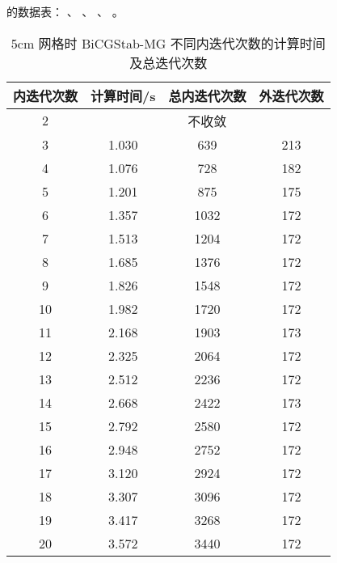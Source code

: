 \begin{datasheet}
的数据表：
、
、
、
。

\begin{table}
\centering
\caption{5cm 网格时 BiCGStab-MG 不同内迭代次数的计算时间及总迭代次数}
\label{tab:equsolve.iter.bicgstab-mg.5cm}
\begin{tabular}{cccc}
\toprule
内迭代次数 & 计算时间/s & 总内迭代次数 & 外迭代次数\\
\midrule
2 & \multicolumn{3}{c}{不收敛} \\  %
3 & 1.030 & 639 & 213\\
4 & 1.076 & 728 & 182\\
5 & 1.201 & 875 & 175\\
6 & 1.357 & 1032 & 172\\
7 & 1.513 & 1204 & 172\\
8 & 1.685 & 1376 & 172\\
9 & 1.826 & 1548 & 172\\
10 & 1.982 & 1720 & 172\\
11 & 2.168 & 1903 & 173\\
12 & 2.325 & 2064 & 172\\
13 & 2.512 & 2236 & 172\\
14 & 2.668 & 2422 & 173\\
15 & 2.792 & 2580 & 172\\
16 & 2.948 & 2752 & 172\\
17 & 3.120 & 2924 & 172\\
18 & 3.307 & 3096 & 172\\
19 & 3.417 & 3268 & 172\\
20 & 3.572 & 3440 & 172\\
\bottomrule
\end{tabular}
\end{table}


\end{datasheet}
